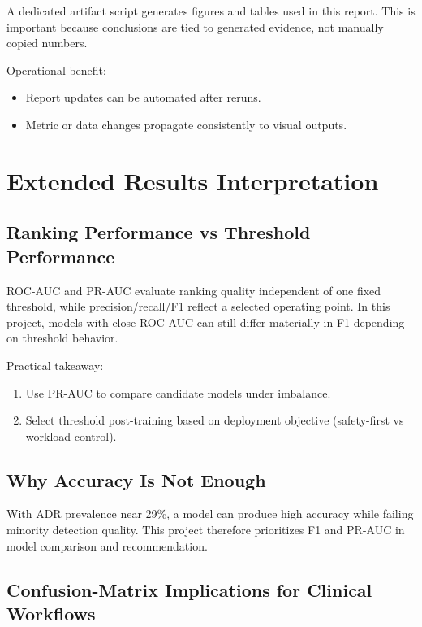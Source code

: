 \documentclass[11pt]{article}
\begin{document}
A dedicated artifact script generates figures and tables used in this report. This is important because conclusions are tied to generated evidence, not manually copied numbers.


Operational benefit:


\begin{itemize}
  \item Report updates can be automated after reruns.
  \item Metric or data changes propagate consistently to visual outputs.
\end{itemize}

\section{Extended Results Interpretation}

\subsection{Ranking Performance vs Threshold Performance}

ROC-AUC and PR-AUC evaluate ranking quality independent of one fixed threshold, while precision/recall/F1 reflect a selected operating point. In this project, models with close ROC-AUC can still differ materially in F1 depending on threshold behavior.


Practical takeaway:


\begin{enumerate}
  \item Use PR-AUC to compare candidate models under imbalance.
  \item Select threshold post-training based on deployment objective (safety-first vs workload control).
\end{enumerate}

\subsection{Why Accuracy Is Not Enough}

With ADR prevalence near 29\%, a model can produce high accuracy while failing minority detection quality. This project therefore prioritizes F1 and PR-AUC in model comparison and recommendation.


\subsection{Confusion-Matrix Implications for Clinical Workflows}
\end{document}
